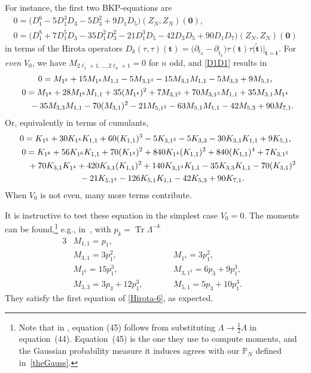 \documentclass[pdftex]{sigma}
\numberwithin{equation}{section}
\begin{document}
For instance, the first two BKP-equations are
\begin{gather}
0 = \bigl(D_1^6-5 D_1^3 D_3-5 D_3^2 +9 D_1 D_5 \bigr)(Z_N,Z_N)(\mathbf{0}), \nonumber \\
0 = \bigl(D_1^8 + 7D_1^5D_3 -35D_1^2D_3^2 - 21D_1^3D_5 - 42D_3D_5 + 90D_1D_7\bigr)(Z_N,Z_N)(\mathbf{0})\label{D1D1}
\end{gather}
in terms of the Hirota operators
$D_k(\tau,\tau)(\mathbf{t}) =\bigl(\partial_{t_{k}}-\partial_{\tilde{t}_k}\bigr)
\tau(\mathbf{t})\tau\bigl(\tilde{\mathbf{t}}\bigr)\big|_{\tilde{\mathbf{t}} = \mathbf{t}}$. For \emph{even} $V_0$, we have $M_{2\ell_1 + 1,\dots,2\ell_n + 1} = 0$ for $n$ odd, and \eqref{D1D1} results in
\begin{gather}
0 = M_{1^6} + 15 M_{1^4} M_{1,1} - 5 M_{3,1^3} - 15 M_{3,1}M_{1,1} - 5M_{3,3} + 9 M_{5,1}, \nonumber\\
0 = M_{1^8} + 28M_{1^6}M_{1,1} + 35(M_{1^4})^2 + 7M_{3,1^5} + 70M_{3,1^3}M_{1,1} + 35M_{3,1}M_{1^4} \nonumber\\
\hphantom{0 =}{}
- 35M_{3,3}M_{1,1} - 70(M_{3,1})^2 - 21 M_{5,1^3} - 63M_{5,1}M_{1,1} - 42M_{5,3} + 90 M_{7,1} .\label{Hirota-6}
\end{gather}
Or, equivalently in terms of cumulants,
\begin{gather*}
0 = K_{1^6} + 30K_{1^4}K_{1,1} + 60(K_{1,1})^3 - 5K_{3,1^3} - 5K_{3,3} - 30K_{3,1}K_{1,1} + 9K_{5,1}, \\
0 = K_{1^8} + 56 K_{1^6}K_{1,1} + 70(K_{1^4})^2 + 840 K_{1^4}(K_{1,1})^2 + 840(K_{1,1})^4 + 7K_{3,1^5} \\
\hphantom{0 =}{} + 70K_{3,1}K_{1^4} + 420 K_{3,1}(K_{1,1})^2 + 140K_{3,1^3}K_{1,1} - 35 K_{3,3}K_{1,1} - 70 (K_{3,1})^2 \\
\hphantom{0 =}{} - 21K_{5,1^3} -126 K_{5,1}K_{1,1} - 42 K_{5,3} + 90 K_{7,1}.
\end{gather*}
When $V_0$ is not even, many more terms contribute.

It is instructive to test these equation in the simplest case $V_0 = 0$. The moments can be found,\footnote{Note that in \cite{Mironov:2020tjf}, equation (45) follows from substituting $\Lambda \rightarrow \frac{1}{2}\Lambda$ in equation~(44). Equation~(45) is the one they use to compute moments, and the Gaussian probability measure it induces agrees with our $\mathbb{P}_N$ defined in~\eqref{theGauss}.} e.g., in~\cite{Mironov:2020tjf}, with
$p_k = \operatorname{Tr}\Lambda^{-k}$
\begin{alignat*}{3}
&M_{1,1} = p_1, && & \\
&M_{3,1} = 3 p_1^2, \qquad && M_{1^4} = 3 p_1^2, \\
&M_{1^6} = 15 p_1^3, \qquad && M_{3,1^3} = 6 p_3+9 p_1^3, \\
&M_{3,3} =3 p_3+12 p_1^3, \qquad && M_{5,1} = 5 p_3+10 p_1^3.
\end{alignat*}
They satisfy the first equation of \eqref{Hirota-6}, as expected.
\end{document}
